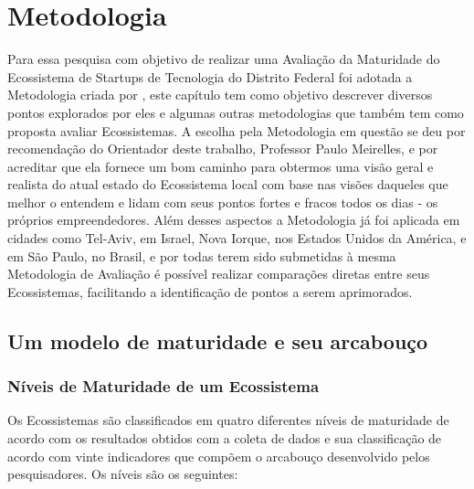 \chapter[Metodologia]{Metodologia}
\label{cap-metodologia}

Para essa pesquisa com objetivo de realizar uma Avaliação da Maturidade do Ecossistema de Startups de Tecnologia do Distrito Federal foi adotada a Metodologia criada por , este capítulo tem como objetivo descrever diversos pontos explorados por eles e algumas outras metodologias que também tem como proposta avaliar Ecossistemas.
A escolha pela Metodologia em questão se deu por recomendação do Orientador deste trabalho, Professor Paulo Meirelles, e por acreditar que ela fornece um bom caminho para obtermos uma visão geral e realista do atual estado do Ecossistema local com base nas visões daqueles que melhor o entendem e lidam com seus pontos fortes e fracos todos os dias - os próprios empreendedores. Além desses aspectos a Metodologia já foi aplicada em cidades como Tel-Aviv, em Israel, Nova Iorque, nos Estados Unidos da América, e em São Paulo, no Brasil, e por todas terem sido submetidas à mesma Metodologia de Avaliação é possível realizar comparações diretas entre seus Ecossistemas, facilitando a identificação de pontos a serem aprimorados. 

\section{Um modelo de maturidade e seu arcabouço}
\label{section:metodologia_de_avaliacao_adotada}




\subsection{Níveis de Maturidade de um Ecossistema}
\label{subsection:niveis_de_maturidade_de_um_ecossistema}

Os Ecossistemas são classificados em quatro diferentes níveis de maturidade de acordo com os resultados obtidos com a coleta de dados e sua classificação de acordo com vinte indicadores que compõem o arcabouço desenvolvido pelos pesquisadores. Os níveis são os seguintes:

